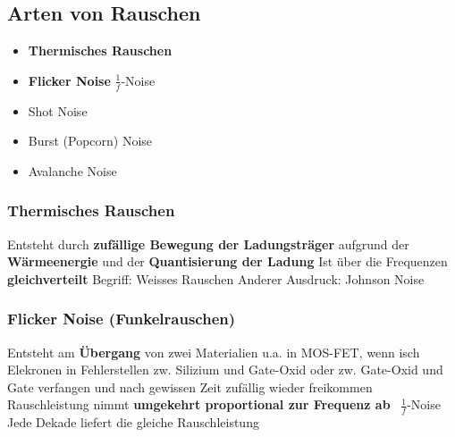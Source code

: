 \subsection{Arten von Rauschen}

\begin{minipage}[t]{0.48\columnwidth}
    \begin{itemize}
        \item \textbf{Thermisches Rauschen}
        \item \textbf{Flicker Noise} $\frac{1}{f}$-Noise
    \end{itemize}
\end{minipage}
\hfill
\begin{minipage}[t]{0.48\columnwidth}
    \begin{itemize}
        \item Shot Noise
        \item Burst (Popcorn) Noise
        \item Avalanche Noise
    \end{itemize}
\end{minipage}


\subsubsection{Thermisches Rauschen}

\begin{outline}
    \1 Entsteht durch \textbf{zufällige Bewegung der Ladungsträger} aufgrund der \textbf{Wärmeenergie}
        und der \textbf{Quantisierung der Ladung}
    \1 Ist über die Frequenzen \textbf{gleichverteilt}
    \1 Begriff: Weisses Rauschen
        \2 Anderer Ausdruck: Johnson Noise
\end{outline}


\subsubsection{Flicker Noise (Funkelrauschen)}

\begin{outline}
    \1 Entsteht am \textbf{Übergang} von zwei Materialien
        \2 u.a. in MOS-FET, wenn isch Elekronen in Fehlerstellen zw. Silizium und Gate-Oxid oder zw. Gate-Oxid 
            und Gate verfangen und nach gewissen Zeit zufällig wieder freikommen
    \1 Rauschleistung nimmt \textbf{umgekehrt proportional zur Frequenz ab} \textrightarrow\ $\frac{1}{f}$-Noise
    \1 Jede Dekade liefert die gleiche Rauschleistung
\end{outline}


